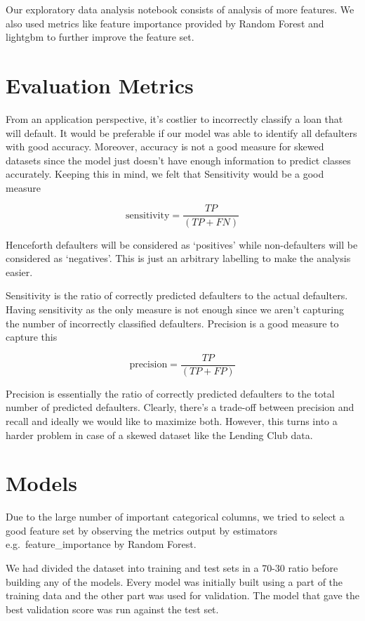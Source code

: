 \documentclass[conference]{IEEEtran}
\begin{document}
Our exploratory data analysis notebook consists of analysis of more features.
We also used metrics like feature importance provided by Random Forest and
lightgbm to further improve the feature set.

\section{Evaluation Metrics}
From an application perspective, it's costlier to incorrectly classify a loan
that will default. It would be preferable if our model was able to identify all
defaulters with good accuracy. Moreover, accuracy is not a good measure for
skewed datasets since the model just doesn't have enough information to predict
classes accurately. Keeping this in mind, we felt that Sensitivity
would be a good measure

\begin{equation*}
    \text{sensitivity} = \frac{TP}{(TP + FN)}
\end{equation*}

Henceforth defaulters will be considered as `positives' while non-defaulters
will be considered as `negatives'. This is just an arbitrary labelling to make
the analysis easier.

Sensitivity is the ratio of correctly predicted defaulters to the actual
defaulters. Having sensitivity as the only measure is not enough since we
aren't capturing the number of incorrectly classified defaulters. Precision is
a good measure to capture this

\begin{equation*}
    \text{precision} = \frac{TP}{(TP + FP)}
\end{equation*}

Precision is essentially the ratio of correctly predicted defaulters to the
total number of predicted defaulters. Clearly, there's a trade-off between
precision and recall and ideally we would like to maximize both. However,
this turns into a harder problem in case of a skewed dataset like the Lending Club
data.

\section{Models}
Due to the large number of important categorical columns, we tried to select a
good feature set by observing the metrics output by estimators e.g.\
feature\_importance by Random Forest.

We had divided the dataset into training and test sets in a 70-30 ratio before
building any of the models. Every model was initially built using a part of
the training data and the other part was used for validation. The model that
gave the best validation score was run against the test set.
\end{document}
